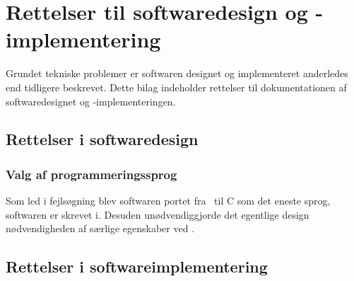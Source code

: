 \chapter{Rettelser til softwaredesign og -implementering}
\label{ch:bilag-rettelser-software}


Grundet tekniske problemer er softwaren designet og implementeret
anderledes end tidligere beskrevet. Dette bilag indeholder rettelser
til dokumentationen af softwaredesignet og -implementeringen.

\section{Rettelser i softwaredesign}




\subsection{Valg af programmeringssprog}
\label{sec:bilag-programmeringssprog}

Som led i fejlsøgning blev softwaren portet fra \Cpp\ til C som det
eneste sprog, softwaren er skrevet i. Desuden unødvendiggjorde det
egentlige design nødvendigheden af særlige egenskaber ved \Cpp .

\section{Rettelser i softwareimplementering}


